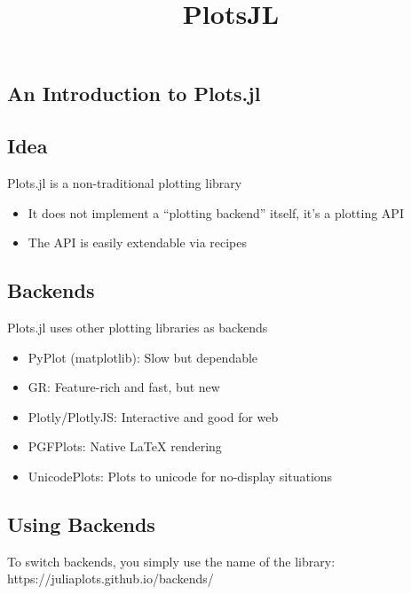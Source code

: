 \documentclass[11pt]{article}
\title{PlotsJL}
\begin{document}
    
    
    \maketitle
    
    

    
    \subsection{An Introduction to
Plots.jl}\label{an-introduction-to-plots.jl}

    \subsection{Idea}\label{idea}

Plots.jl is a non-traditional plotting library

\begin{itemize}
\itemsep1pt\parskip0pt
\item
  It does not implement a ``plotting backend'' itself, it's a plotting
  API
\item
  The API is easily extendable via recipes
\end{itemize}

    \subsection{Backends}\label{backends}

Plots.jl uses other plotting libraries as backends

\begin{itemize}
\itemsep1pt\parskip0pt
\item
  PyPlot (matplotlib): Slow but dependable
\item
  GR: Feature-rich and fast, but new
\item
  Plotly/PlotlyJS: Interactive and good for web
\item
  PGFPlots: Native LaTeX rendering
\item
  UnicodePlots: Plots to unicode for no-display situations
\end{itemize}

    \subsection{Using Backends}\label{using-backends}

To switch backends, you simply use the name of the library:
https://juliaplots.github.io/backends/
\end{document}
